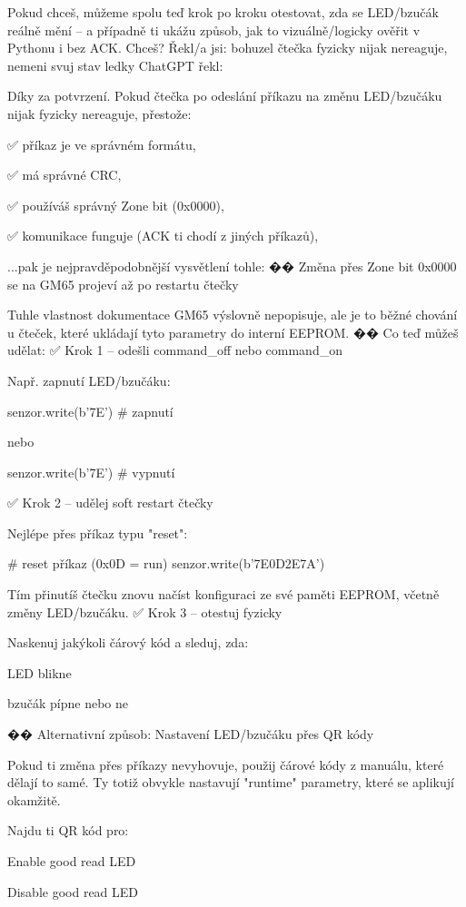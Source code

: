 Pokud chceš, můžeme spolu teď krok po kroku otestovat, zda se LED/bzučák reálně mění – a případně ti ukážu způsob, jak to vizuálně/logicky ověřit v Pythonu i bez ACK. Chceš?
Řekl/a jsi:
bohuzel čtečka fyzicky nijak nereaguje, nemeni svuj stav ledky
ChatGPT řekl:

Díky za potvrzení. Pokud čtečka po odeslání příkazu na změnu LED/bzučáku nijak fyzicky nereaguje, přestože:

    ✅ příkaz je ve správném formátu,

    ✅ má správné CRC,

    ✅ používáš správný Zone bit (0x0000),

    ✅ komunikace funguje (ACK ti chodí z jiných příkazů),

...pak je nejpravděpodobnější vysvětlení tohle:
�� Změna přes Zone bit 0x0000 se na GM65 projeví až po restartu čtečky

Tuhle vlastnost dokumentace GM65 výslovně nepopisuje, ale je to běžné chování u čteček, které ukládají tyto parametry do interní EEPROM.
�� Co teď můžeš udělat:
✅ Krok 1 – odešli command_off nebo command_on

Např. zapnutí LED/bzučáku:

senzor.write(b'\x7E\xBD')  # zapnutí

nebo

senzor.write(b'\x7E')  # vypnutí

✅ Krok 2 – udělej soft restart čtečky

Nejlépe přes příkaz typu "reset":

# reset příkaz (0x0D = run)
senzor.write(b'\x7E\x0D\x2E\x7A')

Tím přinutíš čtečku znovu načíst konfiguraci ze své paměti EEPROM, včetně změny LED/bzučáku.
✅ Krok 3 – otestuj fyzicky

Naskenuj jakýkoli čárový kód a sleduj, zda:

    LED blikne

    bzučák pípne nebo ne

�� Alternativní způsob: Nastavení LED/bzučáku přes QR kódy

Pokud ti změna přes příkazy nevyhovuje, použij čárové kódy z manuálu, které dělají to samé. Ty totiž obvykle nastavují "runtime" parametry, které se aplikují okamžitě.

Najdu ti QR kód pro:

    Enable good read LED

    Disable good read LED

